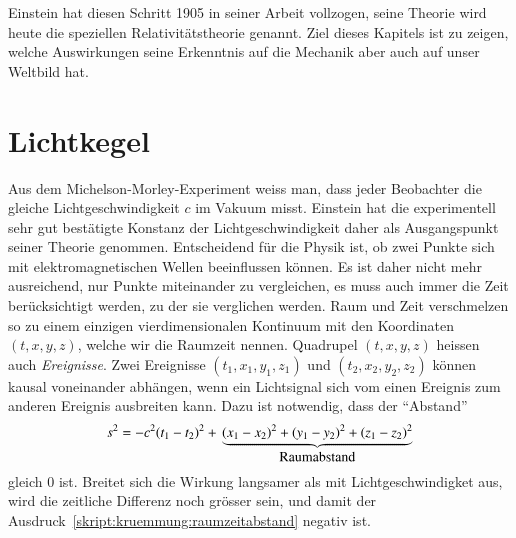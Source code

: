 Einstein hat diesen Schritt 1905 in seiner Arbeit \cite{skript:einstein}
vollzogen, seine Theorie wird heute die speziellen Relativitätstheorie genannt.
Ziel dieses Kapitels ist zu zeigen, welche Auswirkungen seine
Erkenntnis auf die Mechanik aber auch auf unser Weltbild hat.

\section{Lichtkegel}
Aus dem Michelson-Morley-Experiment weiss man, dass jeder Beobachter
die gleiche Lichtgeschwindigkeit $c$ im Vakuum misst.
Einstein hat die experimentell sehr gut bestätigte Konstanz der
Lichtgeschwindigkeit daher als Ausgangspunkt seiner Theorie genommen.
Entscheidend für die Physik ist, ob zwei Punkte sich mit elektromagnetischen
Wellen beeinflussen können.
Es ist daher nicht mehr ausreichend, nur Punkte miteinander zu vergleichen,
es muss auch immer die Zeit berücksichtigt werden, zu der sie verglichen
werden.
Raum und Zeit verschmelzen so zu einem einzigen vierdimensionalen
Kontinuum mit den Koordinaten $(t,x,y,z)$, welche wir die Raumzeit
nennen.
Quadrupel $(t,x,y,z)$ heissen auch {\em Ereignisse}.
Zwei Ereignisse $(t_1,x_1,y_1,z_1)$ und $(t_2,x_2,y_2,z_2)$ können
kausal voneinander abhängen, wenn ein Lichtsignal sich vom einen Ereignis
zum anderen Ereignis ausbreiten kann.
Dazu ist notwendig, dass der ``Abstand''
\begin{equation}
s^2
=
-c^2(t_1-t_2)^2
+
\mathstrut
\underbrace{
(x_1-x_2)^2
+
(y_1-y_2)^2
+
(z_1-z_2)^2}_{\displaystyle\text{Raumabstand}}
\label{skript:kruemmung:raumzeitabstand}
\end{equation}
gleich $0$ ist.
Breitet sich die Wirkung langsamer als mit Lichtgeschwindigket aus,
wird die zeitliche Differenz noch grösser sein, und damit der
Ausdruck~\eqref{skript:kruemmung:raumzeitabstand} negativ ist.

